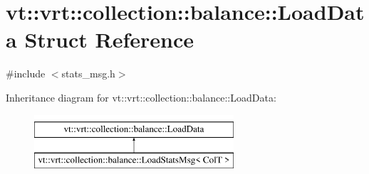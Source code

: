 \hypertarget{structvt_1_1vrt_1_1collection_1_1balance_1_1_load_data}{}\section{vt\+:\+:vrt\+:\+:collection\+:\+:balance\+:\+:Load\+Data Struct Reference}
\label{structvt_1_1vrt_1_1collection_1_1balance_1_1_load_data}


{\ttfamily \#include $<$stats\+\_\+msg.\+h$>$}

Inheritance diagram for vt\+:\+:vrt\+:\+:collection\+:\+:balance\+:\+:Load\+Data\+:\begin{figure}[H]
\begin{center}
\leavevmode
\includegraphics[height=2.000000cm]{structvt_1_1vrt_1_1collection_1_1balance_1_1_load_data}
\end{center}
\end{figure}
